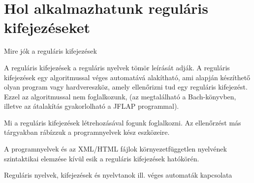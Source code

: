 \documentclass[
    ignorenonframetext
    ]{beamer}
\begin{document}
% 

\section{Hol alkalmazhatunk reguláris kifejezéseket}

\begin{frame}
    {Mire jók a reguláris kifejezések}

    A reguláris kifejezések a reguláris nyelvek tömör leírását adják. A
    reguláris kifejezések egy algoritmussal véges automatává alakítható,
    ami alapján készíthető olyan program vagy hardvereszköz, amely
    ellenőrizni tud egy reguláris kifejezést. Ezzel az algoritmussal nem
    foglalkozunk, (az megtalálható a Bach-könyvben, illetve az átalakítás
    gyakorlolható a JFLAP programmal).

    \vfill
    Mi a reguláris kifejezések létrehozásával fogunk foglalkozni. Az
    ellenőrzést más tárgyakban rábízzuk a programnyelvek kész eszközeire.

    \vfill
    A programnyelvek és az XML/HTML fájlok környezetfüggetlen nyelvének
    szintaktikai elemzése kívül esik a reguláris kifejezések hatókörén.
\end{frame}

\begin{frame}
    {Reguláris nyelvek, kifejezések és nyelvtanok ill. véges automaták
    kapcsolata}

\end{frame}
\end{document}

